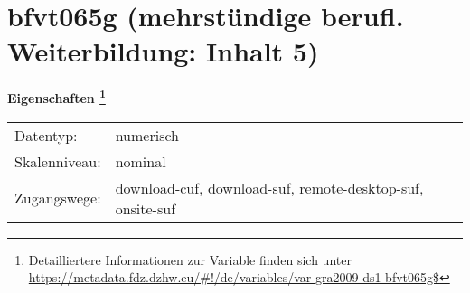 
    \setcounter{footnote}{0}

    \vspace*{-1.8cm}
	\section{bfvt065g (mehrstündige berufl. Weiterbildung: Inhalt 5)}
	\label{section:bfvt065g}



    \vspace*{0.5cm}
    \noindent\textbf{Eigenschaften
	\footnote{Detailliertere Informationen zur Variable finden sich unter
		\url{https://metadata.fdz.dzhw.eu/\#!/de/variables/var-gra2009-ds1-bfvt065g$}}}\\
	\begin{tabularx}{\hsize}{@{}lX}
	Datentyp: & numerisch \\
	Skalenniveau: & nominal \\
	Zugangswege: &
	  download-cuf, 
	  download-suf, 
	  remote-desktop-suf, 
	  onsite-suf
 \\
    \end{tabularx}



